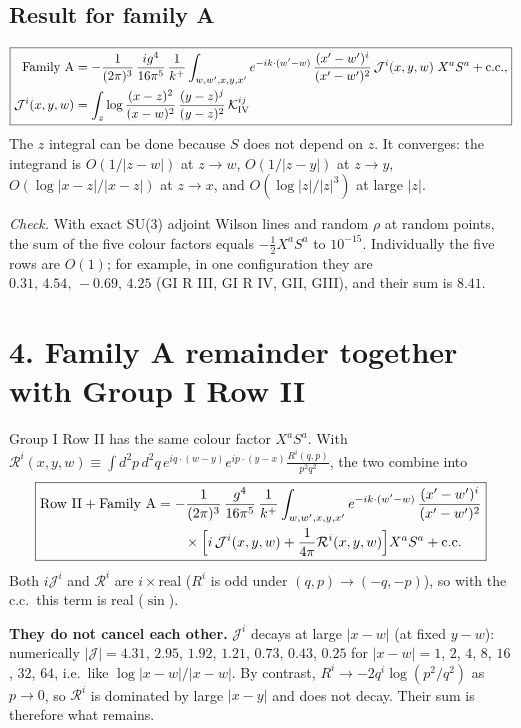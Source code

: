\documentclass[10pt]{article}
\begin{document}
\subsection*{Result for family A}
\begin{equation}
\boxed{\begin{aligned}\text{Family A}&=-\frac{1}{(2\pi)^{3}}\,\frac{ig^{4}}{16\pi^{5}}\,\frac{1}{k^{+}}\int_{w,w',x,y,x'}e^{-ik\cdot(w'-w)}\,\frac{(x'-w')^{i}}{(x'-w')^{2}}\,\mathcal J^{i}(x,y,w)\;X^{a}S^{a}+{\rm c.c.},\\
\mathcal J^{i}(x,y,w)&=\int_{z}\log\frac{(x-z)^{2}}{(x-w)^{2}}\,\frac{(y-z)^{j}}{(y-z)^{2}}\,\mathcal K^{ij}_{\rm IV}\end{aligned}}
\end{equation}
The $z$ integral can be done because $S$ does not depend on $z$. It converges: the integrand is $O(1/|z-w|)$ at $z\to w$, $O(1/|z-y|)$ at $z\to y$, $O(\log|x-z|/|x-z|)$ at $z\to x$, and $O(\log|z|/|z|^{3})$ at large $|z|$.

\noindent\textit{Check.} With exact SU(3) adjoint Wilson lines and random $\rho$ at random points, the sum of the five colour factors equals $-\frac12X^{a}S^{a}$ to $10^{-15}$. Individually the five rows are $O(1)$; for example, in one configuration they are $0.31,\,4.54,\,-0.69,\,4.25$ (GI R III, GI R IV, GII, GIII), and their sum is $8.41$.

\section*{4. Family A remainder together with Group I Row II}
Group I Row II has the same colour factor $X^{a}S^{a}$. With $\mathcal R^{i}(x,y,w)\equiv\int d^{2}p\,d^{2}q\,e^{iq\cdot(w-y)}e^{ip\cdot(y-x)}\frac{R^{i}(q,p)}{p^{2}q^{2}}$, the two combine into
\begin{equation}
\boxed{\begin{aligned}\text{Row II}+\text{Family A}&=-\frac{1}{(2\pi)^{3}}\,\frac{g^{4}}{16\pi^{5}}\,\frac{1}{k^{+}}\int_{w,w',x,y,x'}e^{-ik\cdot(w'-w)}\,\frac{(x'-w')^{i}}{(x'-w')^{2}}\\&\qquad\times\Big[i\,\mathcal J^{i}(x,y,w)+\frac{1}{4\pi}\mathcal R^{i}(x,y,w)\Big]X^{a}S^{a}+{\rm c.c.}\end{aligned}}
\end{equation}
Both $i\mathcal J^{i}$ and $\mathcal R^{i}$ are $i\times$real ($R^{i}$ is odd under $(q,p)\to(-q,-p)$), so with the c.c.\ this term is real ($\sin$).

\textbf{They do not cancel each other.} $\mathcal J^{i}$ decays at large $|x-w|$ (at fixed $y-w$): numerically $|\mathcal J|=4.31$, $2.95$, $1.92$, $1.21$, $0.73$, $0.43$, $0.25$ for $|x-w|=1$, $2$, $4$, $8$, $16$, $32$, $64$, i.e.\ like $\log|x-w|/|x-w|$. By contrast, $R^{i}\to-2q^{i}\log(p^{2}/q^{2})$ as $p\to0$, so $\mathcal R^{i}$ is dominated by large $|x-y|$ and does not decay. Their sum is therefore what remains.
\end{document}

